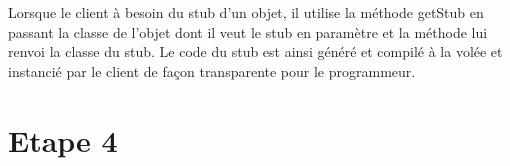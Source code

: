 \documentclass[a4paper,12pt]{article}
\begin{document}
Lorsque le client à besoin du stub d'un objet, il utilise la méthode getStub en passant la classe de l'objet dont il veut le stub en paramètre et la méthode lui renvoi la classe du stub. Le code du stub est ainsi généré et compilé à la volée et instancié par le client de façon transparente pour le programmeur.

\clearpage
\section{Etape 4}
\end{document}

